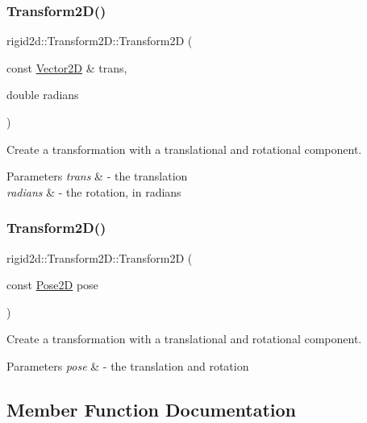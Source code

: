 \subsubsection{\texorpdfstring{Transform2\+D()}{Transform2D()}\hspace{0.1cm}{\footnotesize\ttfamily [3/4]}}
{\footnotesize\ttfamily rigid2d\+::\+Transform2\+D\+::\+Transform2D (\begin{DoxyParamCaption}\item[{const \hyperlink{structrigid2d_1_1Vector2D}{Vector2D} \&}]{trans,  }\item[{double}]{radians }\end{DoxyParamCaption})}



Create a transformation with a translational and rotational component. 


\begin{DoxyParams}{Parameters}
{\em trans} & -\/ the translation \\
\hline
{\em radians} & -\/ the rotation, in radians \\
\hline
\end{DoxyParams}
\mbox{\label{classrigid2d_1_1Transform2D_a7eee10e3bf1cfdc0df928b9401750dba}} 
\subsubsection{\texorpdfstring{Transform2\+D()}{Transform2D()}\hspace{0.1cm}{\footnotesize\ttfamily [4/4]}}
{\footnotesize\ttfamily rigid2d\+::\+Transform2\+D\+::\+Transform2D (\begin{DoxyParamCaption}\item[{const \hyperlink{structrigid2d_1_1Pose2D}{Pose2D}}]{pose }\end{DoxyParamCaption})}



Create a transformation with a translational and rotational component. 


\begin{DoxyParams}{Parameters}
{\em pose} & -\/ the translation and rotation \\
\hline
\end{DoxyParams}


\subsection{Member Function Documentation}
\mbox{\label{classrigid2d_1_1Transform2D_adb4a148944f3629222080db727397f0a}} 
